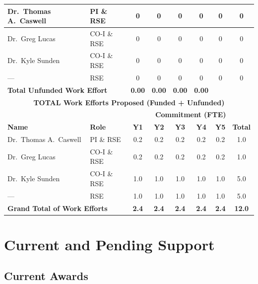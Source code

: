 \documentclass[12pt]{article}
\numberwithin{page}{section}
\begin{document}
\begin{tabular}{|l|l|c|c|c|c|c|c|}
  Dr.\ Thomas A.\ Caswell & PI \& RSE   & 0 & 0 & 0 & 0 & 0 & 0 \\  \hline
  Dr.\ Greg Lucas         & CO-I \& RSE & 0 & 0 & 0 & 0 & 0 & 0 \\  \hline
  Dr.\ Kyle Sunden        & CO-I \& RSE & 0 & 0 & 0 & 0 & 0 & 0 \\  \hline
  ---                     & RSE         & 0 & 0 & 0 & 0 & 0 & 0 \\  \hline
  \multicolumn{2}{|l|}{\textbf{Total Unfunded Work Effort}} & \textbf{0.00} & \textbf{0.00} & \textbf{0.00}& \textbf{0.00}\\\hline
  \multicolumn{8}{|c|}{\cellcolor{gray!30}\textbf{TOTAL Work Efforts Proposed (Funded + Unfunded)}}\\  \hline
  \cellcolor{gray!30} &  \cellcolor{gray!30}&\multicolumn{6}{c|}{\cellcolor{gray!30}\textbf{Commitment (FTE)}} \\
  \hhline{|*2{>{\arrayrulecolor{gray!30}}-}*4{>{\arrayrulecolor{black}}-}|}
  \cellcolor{gray!30}\textbf{Name }& \cellcolor{gray!30}\textbf{Role} & \cellcolor{gray!30}\textbf{Y1} & \cellcolor{gray!30}\textbf{Y2} & \cellcolor{gray!30}\textbf{Y3}& \cellcolor{gray!30}\textbf{Y4}& \cellcolor{gray!30}\textbf{Y5} & \cellcolor{gray!30}\textbf{Total}     \\  \hline
  Dr.\ Thomas A.\ Caswell & PI \& RSE   & 0.2 & 0.2 & 0.2 & 0.2 & 0.2 & 1.0 \\  \hline
  Dr.\ Greg Lucas         & CO-I \& RSE & 0.2 & 0.2 & 0.2 & 0.2 & 0.2 & 1.0 \\  \hline
  Dr.\ Kyle Sunden        & CO-I \& RSE & 1.0 & 1.0 & 1.0 & 1.0 & 1.0 & 5.0 \\  \hline
  ---                     & RSE         & 1.0 & 1.0 & 1.0 & 1.0 & 1.0 & 5.0 \\  \hline
  \multicolumn{2}{|l|}{\textbf{Grand Total of Work Efforts}} & \textbf{2.4}& \textbf{2.4}& \textbf{2.4}& \textbf{2.4}& \textbf{2.4} &  \textbf{12.0}\\    \hline
\end{tabular}



\newpage
\section{Current and Pending Support}
\setcounter{page}{1}
\subsection{Current Awards}
\end{document}
